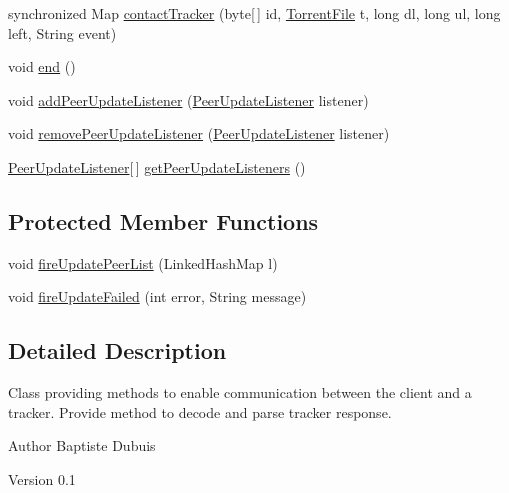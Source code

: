 \begin{DoxyCompactItemize}
\item 
synchronized Map \hyperlink{classj_bittorrent_a_p_i_1_1_peer_updater_ad3ea391dbd2de9c4a5365a082ced4b10}{contactTracker} (byte\mbox{[}$\,$\mbox{]} id, \hyperlink{classj_bittorrent_a_p_i_1_1_torrent_file}{TorrentFile} t, long dl, long ul, long left, String event)
\item 
void \hyperlink{classj_bittorrent_a_p_i_1_1_peer_updater_aa490aed641391fcc6777449c44872c25}{end} ()
\item 
void \hyperlink{classj_bittorrent_a_p_i_1_1_peer_updater_ae0f20884a45817fec9f86f4647a9c348}{addPeerUpdateListener} (\hyperlink{interfacej_bittorrent_a_p_i_1_1_peer_update_listener}{PeerUpdateListener} listener)
\item 
void \hyperlink{classj_bittorrent_a_p_i_1_1_peer_updater_adb6e86e7512b62f68d86dd2c124277cb}{removePeerUpdateListener} (\hyperlink{interfacej_bittorrent_a_p_i_1_1_peer_update_listener}{PeerUpdateListener} listener)
\item 
\hyperlink{interfacej_bittorrent_a_p_i_1_1_peer_update_listener}{PeerUpdateListener}\mbox{[}$\,$\mbox{]} \hyperlink{classj_bittorrent_a_p_i_1_1_peer_updater_a63330888bcb78a7ac1b416850652d802}{getPeerUpdateListeners} ()
\end{DoxyCompactItemize}
\subsection*{Protected Member Functions}
\begin{DoxyCompactItemize}
\item 
void \hyperlink{classj_bittorrent_a_p_i_1_1_peer_updater_a660e9bcab08ec687992ce4ae43a21078}{fireUpdatePeerList} (LinkedHashMap l)
\item 
void \hyperlink{classj_bittorrent_a_p_i_1_1_peer_updater_a2dfaa68f550f920bc4099f4c6aee29a3}{fireUpdateFailed} (int error, String message)
\end{DoxyCompactItemize}


\subsection{Detailed Description}
Class providing methods to enable communication between the client and a tracker. Provide method to decode and parse tracker response.

\begin{DoxyAuthor}{Author}
Baptiste Dubuis 
\end{DoxyAuthor}
\begin{DoxyVersion}{Version}
0.1 
\end{DoxyVersion}


